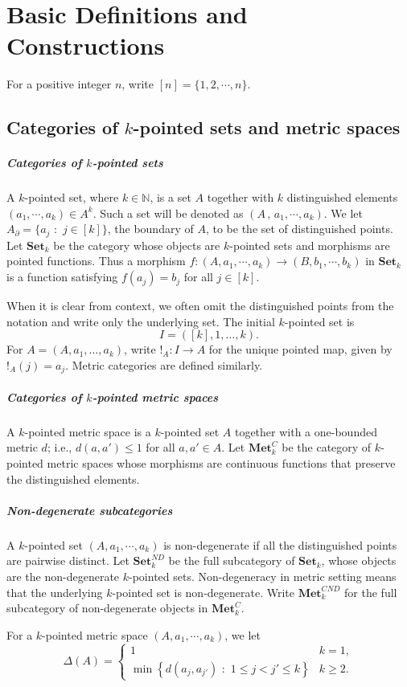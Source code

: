 \documentclass{sn-jnl}%
\theoremstyle{thmstyleone}%
\theoremstyle{thmstyletwo}%
\theoremstyle{thmstylethree}%
\newcommand{\set}{\mathbf{Set}_{k}}
\newcommand{\mc}{\mathbf{Met}_{k}^{C}}
\newcommand{\mcnd}{\mathbf{Met}_{k}^{CND}}
\newcommand{\A}{\left(A, a_1 ,\cdots , a_k\right)}
\newcommand{\B}{\left(B, b_1, \cdots, b_k \right)}
\begin{document}
\section{Basic Definitions and Constructions}
\label{Sec:Definitions}

For a positive integer $n$, write $[n]=\{1,2,\cdots, n\}$.

\subsection{Categories of $k$-pointed sets and metric spaces}

\subparagraph{Categories of $k$-pointed sets} A $k$-pointed set, where $k\in\mathbb{N}$, is a set $A$ together with $k$ distinguished elements $\left( a_1,\cdots, a_k \right)\in A^k$. Such a set will be denoted as $\left( A\, ,\,a_1,\cdots,a_k\right)$. We let $A_\partial=\{a_j \,\,:\,\, j \in [k] \}$, the boundary of $A$, to be the set of distinguished points. Let $\set$ be the category whose objects are $k$-pointed sets and morphisms are pointed functions. Thus a morphism $f: \A \to \B$ in $\set$ is a function satisfying $f(a_j)=b_j$ for all $j \in [k]$. 

When it is clear from context, we often omit the distinguished points from the notation and write only the underlying set. The initial $k$-pointed set is
\begin{equation}
\nonumber
    I=([k],1,\ldots,k).
\end{equation}
For $A=(A,a_1,\ldots,a_k)$, write $!_A:I\to A$ for the unique pointed map, given by $!_A(j)=a_j$. Metric categories are defined similarly.

\subparagraph{Categories of $k$-pointed metric spaces}   A $k$-pointed metric space is a $k$-pointed set $A$ together with a one-bounded metric $d$; i.e., $d(a, a')\leq 1$ for all $a, a' \in A$. Let $\mc$ be the category of $k$-pointed metric spaces whose morphisms are continuous functions that preserve the distinguished elements. 

\subparagraph{Non-degenerate subcategories} A $k$-pointed set $\A$ is non-degenerate if all the distinguished points are pairwise distinct. Let $\set^{ND}$ be the full subcategory of $\set$, whose objects are the non-degenerate $k$-pointed sets. Non-degeneracy in metric setting means that the underlying $k$-pointed set is non-degenerate. Write $\mcnd$ for the full subcategory of non-degenerate objects in $\mc$.

For a $k$-pointed metric space $\A$, we let
    \begin{equation} 
    \nonumber
        \Delta(A)=
        \begin{cases}
            1 & k=1,\\[4pt]
            \displaystyle \min\left\{d(a_{j}, a_{j'}) \,\,:\,\, 1\leq j<j'\leq k\right\} & k\geq 2.
        \end{cases}
    \end{equation}
\end{document}
